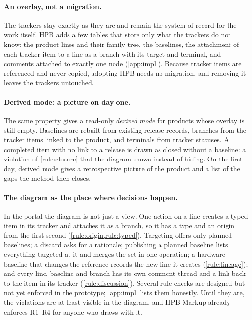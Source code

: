 \paragraph{An overlay, not a migration.}
The trackers stay exactly as they are and remain the system of record for
the work itself. HPB adds a few tables that store only what the trackers
do not know: the product lines and their family tree, the baselines, the
attachment of each tracker item to a line as a branch with its target and
terminal, and comments attached to exactly one node
(\cref{app:impl}). Because tracker items are referenced and never copied,
adopting HPB needs no migration, and removing it leaves the trackers
untouched.

\paragraph{Derived mode: a picture on day one.}
The same property gives a read-only \emph{derived mode} for products
whose overlay is still empty. Baselines are rebuilt from existing release
records, branches from the tracker items linked to the product, and
terminals from tracker statuses. A completed item with no link to a
release is drawn as closed without a baseline: a violation of
\cref{rule:closure} that the diagram shows instead of hiding. On the first
day, derived mode gives a retrospective picture of the product and a list
of the gaps the method then closes.

\paragraph{The diagram as the place where decisions happen.}
In the portal the diagram is not just a view. One action on a line
creates a typed item in its tracker and attaches it as a branch, so it has
a type and an origin from the first second
(\cref{rule:origin,rule:typed}). Targeting offers only planned baselines;
a discard asks for a rationale; publishing a planned baseline lists
everything targeted at it and merges the set in one operation; a hardware
baseline that changes the reference records the new line it creates
(\cref{rule:lineage}); and every line, baseline and branch has its own
comment thread and a link back to the item in its tracker
(\cref{rule:discussion}). Several rule checks are designed but not yet
enforced in the prototype; \cref{app:impl} lists them honestly. Until they
are, the violations are at least visible in the diagram, and HPB Markup
already enforces R1--R4 for anyone who draws with it.
